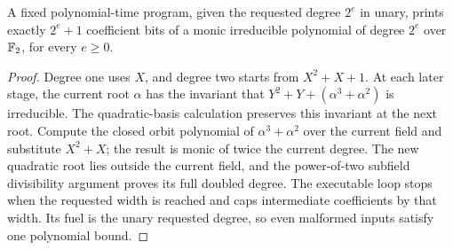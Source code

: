 \begin{lemma}
\label{lem:binary-power-two-irreducible}
\leanok
A fixed polynomial-time program, given the requested degree $2^e$ in unary,
prints exactly $2^e+1$ coefficient bits of a monic irreducible polynomial of
degree $2^e$ over $\mathbb{F}_2$, for every $e\geq 0$.
\end{lemma}
\begin{proof}
\leanok
Degree one uses $X$, and degree two starts from $X^2+X+1$. At each later stage,
the current root $\alpha$ has the invariant that
$Y^2+Y+(\alpha^3+\alpha^2)$ is irreducible. The quadratic-basis calculation
preserves this invariant at the next root. Compute the closed orbit polynomial
of $\alpha^3+\alpha^2$ over the current field and substitute $X^2+X$; the result
is monic of twice the current degree. The new quadratic root lies outside the
current field, and the power-of-two subfield divisibility argument proves its
full doubled degree. The executable loop stops when the requested width is
reached and caps intermediate coefficients by that width. Its fuel is the
unary requested degree, so even malformed inputs satisfy one polynomial bound.
\end{proof}

